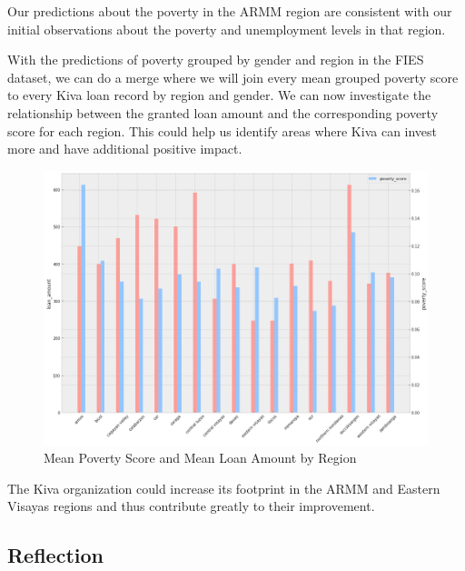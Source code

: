 \documentclass{article}
\begin{document}
Our predictions about the poverty in the ARMM region are consistent with our initial observations about the poverty and unemployment levels in that region.

With the predictions of poverty grouped by gender and region in the FIES dataset, we can do a merge where we will join every mean grouped poverty score to every Kiva loan record by region and gender. We can now investigate the relationship between the granted loan amount and the corresponding poverty score for each region. This could help us identify areas where Kiva can invest more and have additional positive impact.

\begin{figure}[H]
\caption{Mean Poverty Score and Mean Loan Amount by Region}
\centering
\includegraphics[width = 0.7 \textwidth]{poverty_score_loan_region}
\end{figure}

The Kiva organization could increase its footprint in the ARMM and Eastern Visayas regions and thus contribute greatly to their improvement.

\subsection{Reflection}
\end{document}
